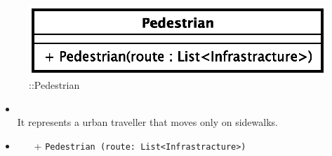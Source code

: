 \begin{figure}[h]
\centering
\includegraphics[scale=0.6,keepaspectratio]{images/solution/app/backend/pedestrian.eps}
\caption{\pActive::Pedestrian}
\label{fig:sd-app-pedestrian}
\end{figure}
\FloatBarrier
\begin{itemize}
  \item \textbf{\descr} \\
It represents a urban traveller that moves only on sidewalks.
\item \textbf{\ops}
  \begin{itemize}
    \item[+] \texttt{Pedestrian (route: List<Infrastracture>)}
  \end{itemize}
\end{itemize} 
